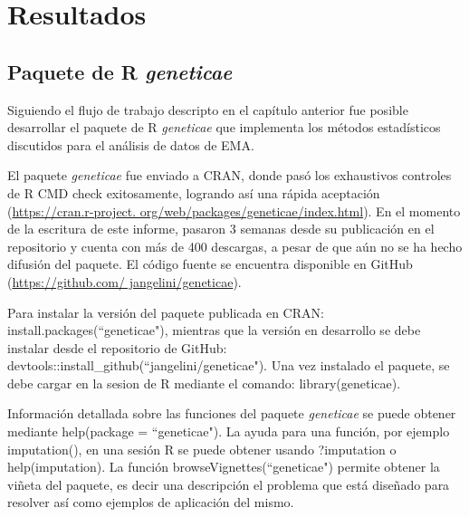 

\chapter{Resultados}

\section{Paquete de R \emph{geneticae}}

Siguiendo el flujo de trabajo descripto en el capítulo anterior fue posible desarrollar el paquete de R \emph{geneticae} que implementa los métodos estadísticos discutidos para el análisis de datos de EMA.

El paquete \emph{geneticae} fue enviado a CRAN, donde pasó los exhaustivos controles de R CMD check exitosamente, logrando así una rápida aceptación  (\url{https://cran.r-project.
org/web/packages/geneticae/index.html}). En el momento de la escritura de este informe, pasaron 3 semanas desde su publicación en el repositorio y cuenta con más de 400 descargas, a pesar de que aún no se ha hecho difusión del paquete. El código fuente se encuentra disponible en GitHub (\url{https://github.com/
jangelini/geneticae}).

Para instalar la versión del paquete publicada en CRAN:  \textcolor{fandango}{install.packages(``geneticae")}, mientras que la versión en desarrollo se debe instalar desde el repositorio de GitHub:  \textcolor{fandango}{devtools::install\_github(``jangelini/geneticae")}. Una vez instalado el paquete, se debe cargar en la sesion de R mediante el comando: \textcolor{fandango}{library(geneticae)}. 

Información detallada sobre las funciones del paquete \emph{geneticae} se puede obtener mediante \textcolor{fandango}{help(package = ``geneticae")}. La ayuda para una función, por ejemplo \textcolor{fandango}{imputation()}, en una sesión R se puede obtener usando \textcolor{fandango}{?imputation} o \textcolor{fandango}{help(imputation)}. La función \textcolor{fandango}{browseVignettes(``geneticae")} permite obtener la viñeta del paquete, es decir una descripción el problema que está diseñado para resolver así como ejemplos de aplicación del mismo. 

